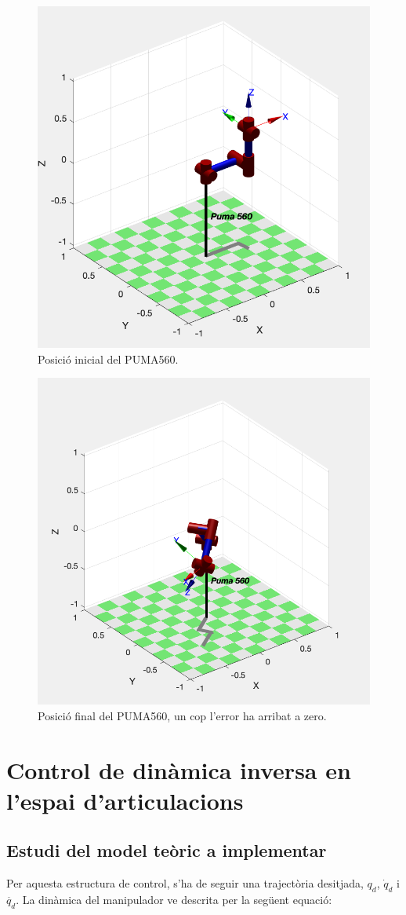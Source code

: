 \documentclass[]{article}
\begin{document}
\begin{figure}[H]
\centering
    \includegraphics[width = 0.6\linewidth]{images/PD_Robot_Initial_q.png}
    \caption{Posició inicial del PUMA560.}
    \label{fig:PD_Robot_initial_q}
\end{figure}

\begin{figure}[H]
\centering
    \includegraphics[width = 0.6\linewidth]{images/PD_Robot_final_q.png}
    \caption{Posició final del PUMA560, un cop l'error ha arribat a zero.}
    \label{fig:PD_Robot_final_q}
\end{figure}

\section{Control de dinàmica inversa en l'espai d'articulacions}

\subsection{Estudi del model teòric a implementar}
Per aquesta estructura de control, s'ha de seguir una trajectòria desitjada, $q_{d}$, $\dot{q}_{d}$ i $\ddot{q_{d}}$. La dinàmica del manipulador ve descrita per la següent equació: \\
\end{document}
